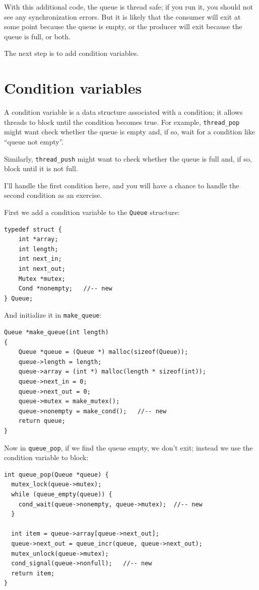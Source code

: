 \documentclass[12pt]{book}
\begin{document}
{With this additional code, the queue is thread safe; if you run it, you
should not see any synchronization errors.  But it is likely
that the consumer will exit at some point because the queue is
empty, or the producer will exit because the queue is full,
or both.

The next step is to add condition variables.


\section{Condition variables}

A condition variable is a data structure associated with a condition;
it allows threads to block until the condition becomes true.  For
example, \verb"thread_pop" might want check whether the queue is
empty and, if so, wait for a condition like ``queue not empty''.

Similarly, \verb"thread_push" might want to check whether the queue is
full and, if so, block until it is not full.

I'll handle the first condition here, and you will have a chance to
handle the second condition as an exercise.

First we add a condition variable to the {\tt Queue} structure:

\begin{verbatim}
typedef struct {
    int *array;
    int length;
    int next_in;
    int next_out;
    Mutex *mutex;
    Cond *nonempty;   //-- new
} Queue;
\end{verbatim}

And initialize it in \verb"make_queue":

\begin{verbatim}
Queue *make_queue(int length)
{
    Queue *queue = (Queue *) malloc(sizeof(Queue));
    queue->length = length;
    queue->array = (int *) malloc(length * sizeof(int));
    queue->next_in = 0;
    queue->next_out = 0;
    queue->mutex = make_mutex();
    queue->nonempty = make_cond();   //-- new
    return queue;
}
\end{verbatim}

Now in \verb"queue_pop", if we find the queue empty, we don't
exit; instead we use the condition variable to block:

\begin{verbatim}
int queue_pop(Queue *queue) {
  mutex_lock(queue->mutex);
  while (queue_empty(queue)) {
    cond_wait(queue->nonempty, queue->mutex);  //-- new
  }
  
  int item = queue->array[queue->next_out];
  queue->next_out = queue_incr(queue, queue->next_out);
  mutex_unlock(queue->mutex);
  cond_signal(queue->nonfull);   //-- new
  return item;
}
\end{verbatim}

}
\end{document}
